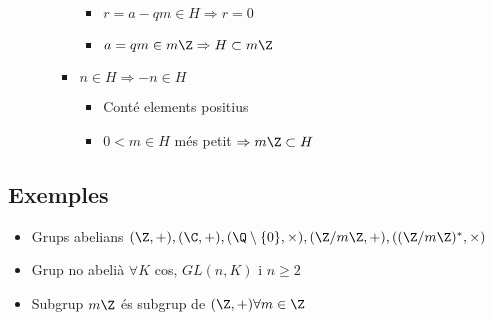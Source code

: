 \begin{itemize}
\begin{itemize}
\begin{itemize}
\begin{itemize}
			\item $r = a - qm \in H \Rightarrow r = 0$
			\item $a = qm \in m\Z \Rightarrow H \subset m\Z$
			\end{itemize}
		\item $n \in H \Rightarrow -n \in H$
			\begin{itemize}
			\item Conté elements positius
			\item $0 < m \in H$ més petit $\Rightarrow m\Z \subset H$
			\end{itemize}
		\end{itemize}
	\end{itemize}
\end{itemize}

\subsection*{Exemples}
\begin{itemize}
\item Grups abelians
	\subitem $(\Z, +), (\C, +), (\Q\setminus\{0\}, \times), (\Z/m\Z, +), ((\Z/m\Z)^*, \times)$
\item Grup no abelià
	\subitem $\forall K$ cos, $GL(n, K)$ i $n \ge 2$
\item Subgrup
	\subitem $m\Z$ és subgrup de $(\Z, +) \forall m \in \Z$
\end{itemize}
